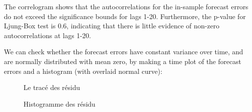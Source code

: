 	The correlogram shows that the autocorrelations for the in-sample forecast errors do not exceed the significance
bounds for lags 1-20. Furthermore, the p-value for Ljung-Box test is 0.6, indicating that there is little evidence of
non-zero autocorrelations at lags 1-20.


\par
We can check whether the forecast errors have constant variance over time, and are normally distributed with
mean zero, by making a time plot of the forecast errors and a histogram (with overlaid normal curve):


\begin{figure}[H]
		\centering
		\caption{Le tracé des résidu}
		\label{fig:plot-resi}
	\end{figure}
	
	\begin{figure}[H]
		\centering
		\caption{Histogramme des résidu}
		\label{fig:hist-resi}
	\end{figure}
	
